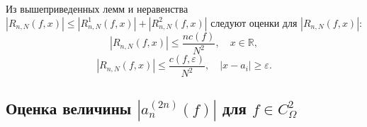 Из вышеприведенных лемм и неравенства $\left|R_{n,N}(f,x)\right|\leq\left|R_{n,N}^{1}(f,x)\right|+\left|R_{n,N}^{2}(f,x)\right|$
следуют оценки для $\left|R_{n,N}(f,x)\right|$:
\begin{equation}
\left|R_{n,N}(f,x)\right|\leq\frac{nc(f)}{N^2},\quad x\in\mathbb{R},\label{eq:R_est1}
\end{equation}
\begin{equation}
\left|R_{n,N}(f,x)\right|\leq\frac{c(f,\varepsilon)}{N^{2}},\quad\left|x-a_{i}\right|\geq\varepsilon.\label{eq:R_est2}
\end{equation}

\subsection{Оценка величины $\left|a_{n}^{(2n)}(f)\right|$ для $f \in C^{2}_\Omega$}

